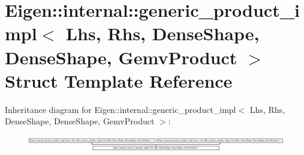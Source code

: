 \hypertarget{struct_eigen_1_1internal_1_1generic__product__impl_3_01_lhs_00_01_rhs_00_01_dense_shape_00_01_de08ea17a2bb9af046a7c3ddff957c62b0}{}\section{Eigen\+:\+:internal\+:\+:generic\+\_\+product\+\_\+impl$<$ Lhs, Rhs, Dense\+Shape, Dense\+Shape, Gemv\+Product $>$ Struct Template Reference}
\label{struct_eigen_1_1internal_1_1generic__product__impl_3_01_lhs_00_01_rhs_00_01_dense_shape_00_01_de08ea17a2bb9af046a7c3ddff957c62b0}
Inheritance diagram for Eigen\+:\+:internal\+:\+:generic\+\_\+product\+\_\+impl$<$ Lhs, Rhs, Dense\+Shape, Dense\+Shape, Gemv\+Product $>$\+:\begin{figure}[H]
\begin{center}
\leavevmode
\includegraphics[height=0.710660cm]{struct_eigen_1_1internal_1_1generic__product__impl_3_01_lhs_00_01_rhs_00_01_dense_shape_00_01_de08ea17a2bb9af046a7c3ddff957c62b0}
\end{center}
\end{figure}
